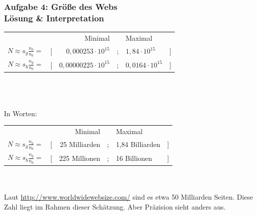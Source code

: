 \documentclass[accentcolor=tud7b,noresetcounter]{tudbeamer}
\begin{document}
  \begin{frame}
    \frametitle{Aufgabe 4: Größe des Webs \\Lösung \& Interpretation}
    \begin{tabular}{rrrcll}
  	 & & Minimal & & Maximal & \\
  	 $N\approx s_g \frac{n_b}{n_0} = $ & $[$ & $0,000253 \cdot 10^{15}$ & ; & $1,84 \cdot 10^{15}$ & $]$ \\
  	 $N\approx s_b \frac{n_g}{n_0} = $ & $[$ & $0,00000225 \cdot 10^{15}$ & ; & $0,0164 \cdot 10^{15}$ & $]$ 
    \end{tabular} \\
  	\hfill \\
  	\hfill \\
    In Worten: \\
    \begin{tabular}{rrrcll}
  	 & & Minimal & & Maximal & \\
  	 $N\approx s_g \frac{n_b}{n_0} = $ & $[$ & 25 Milliarden & ; & 1,84 Billiarden & $]$ \\
  	 $N\approx s_b \frac{n_g}{n_0} = $ & $[$ & 225 Millionen & ; & 16 Billionen & $]$ 
    \end{tabular} \\
    \hfill \\
    Laut \url{http://www.worldwidewebsize.com/} sind es etwa 50 Milliarden Seiten. Diese Zahl liegt im Rahmen dieser Schätzung. Aber Präzision sieht anders aus.
 \end{frame}


  
  
    

\end{document}
